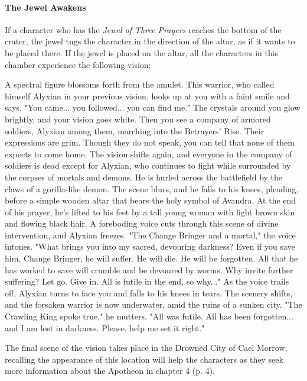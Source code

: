 \documentclass[letterpaper, 11pt, bg=full, twocolumn]{dndbook}
\begin{document}
\paragraph{The Jewel Awakens}

If a character who has the \textit{Jewel of Three Prayers} reaches the bottom of the crater, the jewel tugs the character in the direction of the altar, as if it wants to be placed there. If the jewel is placed on the altar, all the characters in this chamber experience the following vision:

\begin{DndReadAloud}
A spectral figure blossoms forth from the amulet. This warrior, who called himself Alyxian in your previous vision, looks up at you with a faint smile and says, "You came... you followed... you can find me." The crystals around you glow brightly, and your vision goes white. Then you see a company of armored soldiers, Alyxian among them, marching into the Betrayers' Rise. Their expressions are grim. Though they do not speak, you can tell that none of them expects to come home.
The vision shifts again, and everyone in the company of soldiers is dead except for Alyxian, who continues to fight while surrounded by the corpses of mortals and demons. He is hurled across the battlefield by the claws of a gorilla-like demon. The scene blurs, and he falls to his knees, pleading, before a simple wooden altar that bears the holy symbol of Avandra. At the end of his prayer, he's lifted to his feet by a tall young woman with light brown skin and flowing black hair.
A foreboding voice cuts through this scene of divine intervention, and Alyxian freezes. "The Change Bringer and a mortal," the voice intones. "What brings you into my sacred, devouring darkness? Even if you save him, Change Bringer, he will suffer. He will die. He will be forgotten. All that he has worked to save will crumble and be devoured by worms. Why invite further suffering? Let go. Give in. All is futile in the end, so why..."
As the voice trails off, Alyxian turns to face you and falls to his knees in tears. The scenery shifts, and the forsaken warrior is now underwater, amid the ruins of a sunken city. "The Crawling King spoke true," he mutters. "All was futile. All has been forgotten... and I am lost in darkness. Please, help me set it right."
\end{DndReadAloud}

The final scene of the vision takes place in the Drowned City of Cael Morrow; recalling the appearance of this location will help the characters as they seek more information about the Apotheon in chapter 4 (p. 4).
\end{document}
